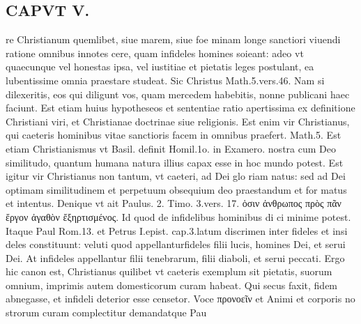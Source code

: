 \documentclass{article}
\begin{document}
\begin{pages}
\section*{CAPVT  V. }
\marginpar{[ p.265 ]}\pstart re Christianum quemlibet, siue marem, siue foe minam longe sanctiori viuendi ratione omnibus innotes cere, quam infideles homines soieant: adeo vt quaecunque vel honestas ipsa, vel iustitiae et pietatis leges postulant, ea lubentissime omnia praestare studeat. Sic Christus Math.5.vers.46. Nam si dilexeritis, eos qui diligunt vos, quam mercedem habebitis, nonne publicani haec faciunt. Est etiam huius hypotheseos et sententiae ratio apertissima ex definitione Christiani viri, et Christianae doctrinae siue religionis. Est enim vir Christianus, qui caeteris hominibus vitae sanctioris facem in omnibus praefert. Math.5. Est etiam Christianismus vt Basil. definit Homil.1o. in Examero. nostra cum Deo similitudo, quantum humana natura illius capax esse in hoc mundo potest. Est igitur vir Christianus non tantum, vt caeteri, ad Dei glo riam natus: sed ad Dei optimam similitudinem et perpetuum obsequium deo praestandum et for matus et intentus. Denique vt ait Paulus. 2. Timo. 3.vers. 17. ὁσιν ἀνθρωπος πρὸς πᾶν ἔργον ἀγαθὸν ἔξηρτισμένος. Id quod de infidelibus hominibus di ci minime potest. Itaque Paul Rom.13. et Petrus I.epist. cap.3.latum discrimen inter fideles et insi deles constituunt: veluti quod appellanturfideles filii lucis, homines Dei, et serui Dei. At infideles appellantur filii tenebrarum, filii diaboli, et serui peccati. Ergo hic canon est, Christianus quilibet vt caeteris exemplum sit pietatis, suorum omnium, imprimis autem domesticorum curam habeat. Qui secus faxit, fidem abnegasse, et infideli deterior esse censetor. Voce προνοεῖν et Animi et corporis no strorum curam complectitur demandatque Pau  \pend

\end{pages}
\end{document}
